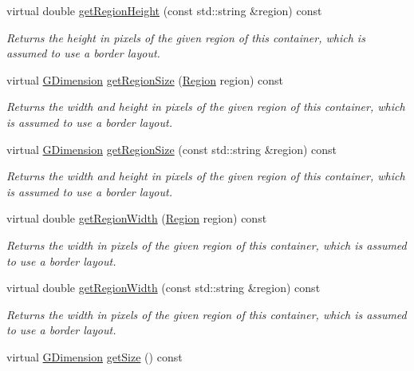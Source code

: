 \begin{DoxyCompactItemize}
virtual double \mbox{\hyperlink{classGContainer_ae8a545e772745b89edaf9804a2dc0057}{get\+Region\+Height}} (const std\+::string \&region) const
\begin{DoxyCompactList}\small\item\em Returns the height in pixels of the given region of this container, which is assumed to use a border layout. \end{DoxyCompactList}\item 
virtual \mbox{\hyperlink{classGDimension}{G\+Dimension}} \mbox{\hyperlink{classGContainer_a3b5db9ffbd4b32260f80634f162dba4e}{get\+Region\+Size}} (\mbox{\hyperlink{classGContainer_a81a01a86de31071a92e6cce0bab9bc4b}{Region}} region) const
\begin{DoxyCompactList}\small\item\em Returns the width and height in pixels of the given region of this container, which is assumed to use a border layout. \end{DoxyCompactList}\item 
virtual \mbox{\hyperlink{classGDimension}{G\+Dimension}} \mbox{\hyperlink{classGContainer_a68b18b38b72cb8779fca0c3882549a6b}{get\+Region\+Size}} (const std\+::string \&region) const
\begin{DoxyCompactList}\small\item\em Returns the width and height in pixels of the given region of this container, which is assumed to use a border layout. \end{DoxyCompactList}\item 
virtual double \mbox{\hyperlink{classGContainer_a96e2005c3f447a8679c3c32d3fc02de1}{get\+Region\+Width}} (\mbox{\hyperlink{classGContainer_a81a01a86de31071a92e6cce0bab9bc4b}{Region}} region) const
\begin{DoxyCompactList}\small\item\em Returns the width in pixels of the given region of this container, which is assumed to use a border layout. \end{DoxyCompactList}\item 
virtual double \mbox{\hyperlink{classGContainer_ab169dab454fc90f1c845b91b4e1a8a14}{get\+Region\+Width}} (const std\+::string \&region) const
\begin{DoxyCompactList}\small\item\em Returns the width in pixels of the given region of this container, which is assumed to use a border layout. \end{DoxyCompactList}\item 
virtual \mbox{\hyperlink{classGDimension}{G\+Dimension}} \mbox{\hyperlink{classGInteractor_a7b4eec96a2bdc6420695d5796a78eea9}{get\+Size}} () const

\end{DoxyCompactItemize}
